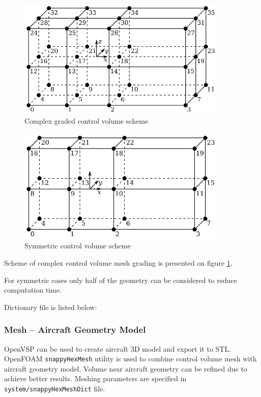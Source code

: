 \begin{figure} [h!]
  \centering
  \includegraphics[width=100mm]{images/openfoam_control_volume_3_1.eps}
  \caption{Complex graded control volume scheme}
  \label{fig-cfd-mesh-complex-grading}
\end{figure}

\begin{figure} [h!]
  \centering
  \includegraphics[width=100mm]{images/openfoam_control_volume_3_2.eps}
  \caption{Symmetric control volume scheme}
\end{figure}

Scheme of complex control volume mesh grading is presented on figure \ref{fig-cfd-mesh-complex-grading}.

For symmetric cases only half of the geometry can be considered to reduce computation time.

Dictionary file is listed below:
\begin{codelistdict}
  
\end{codelistdict}

\subsubsection{Mesh -- Aircraft Geometry Model}

OpenVSP can be used to create aircraft 3D model and export it to STL. OpenFOAM \texttt{snappyHexMesh} utility is used to combine control volume mesh with aircraft geometry model. Volume near aircraft geometry can be refined due to achieve better results. Meshing parameters are specified in \texttt{system/snappyHexMeshDict} file.

